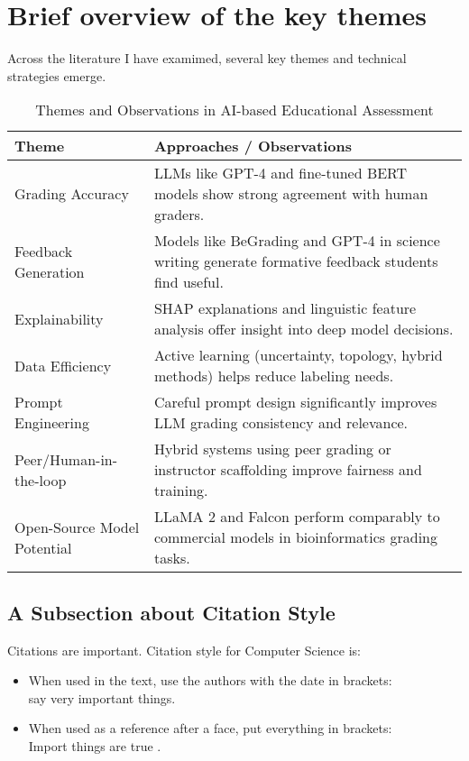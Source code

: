 \documentclass[a4paper,twoside,12pt]{report}
\begin{document}
\section{Brief overview of the key themes}
Across the literature I have examimed, several key themes and technical strategies emerge.

\begin{table}[h!]
  \centering
  \begin{tabular}{|p{5cm}|p{12cm}|}
  \hline
  \textbf{Theme} & \textbf{Approaches / Observations} \\
  \hline
  Grading Accuracy & LLMs like GPT-4 and fine-tuned BERT models show strong agreement with human graders. \\
  \hline
  Feedback Generation & Models like BeGrading and GPT-4 in science writing generate formative feedback students find useful. \\
  \hline
  Explainability & SHAP explanations and linguistic feature analysis offer insight into deep model decisions. \\
  \hline
  Data Efficiency & Active learning (uncertainty, topology, hybrid methods) helps reduce labeling needs. \\
  \hline
  Prompt Engineering & Careful prompt design significantly improves LLM grading consistency and relevance. \\
  \hline
  Peer/Human-in-the-loop & Hybrid systems using peer grading or instructor scaffolding improve fairness and training. \\
  \hline
  Open-Source Model Potential & LLaMA 2 and Falcon perform comparably to commercial models in bioinformatics grading tasks. \\
  \hline
  \end{tabular}
  \caption{Themes and Observations in AI-based Educational Assessment}
  \label{tab:grading_ai_themes}
  \end{table}
  

\subsection{A Subsection about Citation Style}
Citations are important. Citation style for Computer Science is:
\begin{itemize}
\item When used in the text, use the authors with the date in brackets:\\ \citet{klein17} say very important things.
\item When used as a reference after a face, put everything in brackets:\\ Import things are true \citep{klein17}.
\end{itemize}
\end{document}
